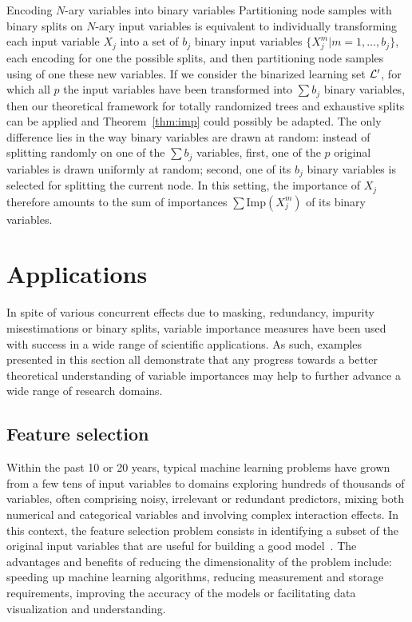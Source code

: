 \begin{remark}{Encoding $N$-ary variables into binary variables}
Partitioning node samples with binary splits on $N$-ary input variables is
equivalent to individually transforming each input variable $X_j$ into a set of
$b_j$ binary input variables $\{X_j^{m} | m=1,\dots,b_j\}$, each encoding for
one the possible splits, and then partitioning node samples using of one these new
variables. If we consider the binarized learning set ${\cal L}^\prime$, for
which all $p$ the input variables have been transformed into $\sum b_j$ binary
variables, then our theoretical framework for totally randomized trees and
exhaustive splits can be applied and Theorem~\ref{thm:imp} could possibly be
adapted. The only difference lies in the way binary variables are drawn at
random:  instead of splitting randomly on one of the $\sum b_j$ variables,
first, one of the $p$ original variables is drawn uniformly at random; second, one of
its $b_j$ binary variables is selected for splitting the current node. In this
setting, the importance of $X_j$ therefore amounts to the sum of importances $\sum
\text{Imp}(X_j^m)$ of its binary variables. \end{remark}


\section{Applications}
\label{sec:7:applications}

In spite of various concurrent effects due to masking, redundancy, impurity
misestimations or binary splits, variable importance measures have been used
with success in a wide range of scientific applications. As such, examples
presented in this section all demonstrate that any progress towards a better
theoretical understanding of variable importances may help to further advance a
wide range of research domains.

\subsection{Feature selection}

Within the past 10 or 20 years, typical machine learning problems have
grown from a few tens of input variables to domains exploring hundreds of
thousands of variables, often comprising noisy, irrelevant or redundant
predictors, mixing both numerical and categorical variables and involving
complex interaction effects. In this context, the feature selection problem
consists in identifying a subset of the original input variables that are
useful for building a good model~\citep{guyon:2003,liu:2005}. The
advantages and benefits of reducing the dimensionality of the problem
include: speeding up machine learning algorithms, reducing measurement and
storage requirements, improving the accuracy of the models or facilitating
data visualization and understanding.

